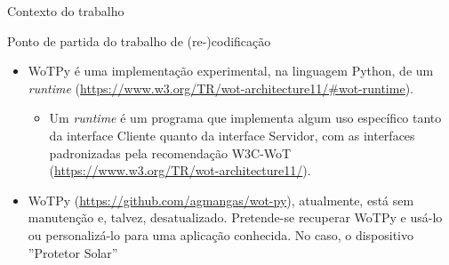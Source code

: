 \begin{frame}{Contexto do trabalho}
    
    \begin{block}{Ponto de partida do trabalho de (re-)codificação}
        \begin{itemize}
            \item WoTPy é uma implementação experimental, na linguagem Python, de um \textit{runtime} (\url{https://www.w3.org/TR/wot-architecture11/\#wot-runtime}). 
            \begin{itemize}
                \item Um \textit{runtime} é um programa que implementa algum uso específico tanto da interface Cliente quanto da interface Servidor, com as interfaces padronizadas pela recomendação W3C-WoT (\url{https://www.w3.org/TR/wot-architecture11/}). 
            \end{itemize}
            \item WoTPy (\url{https://github.com/agmangas/wot-py}), atualmente, está sem manutenção e, talvez, desatualizado. Pretende-se recuperar WoTPy e usá-lo ou personalizá-lo para uma aplicação conhecida. No caso, o dispositivo ''Protetor Solar''
        \end{itemize}
        
        
    \end{block}

\end{frame}